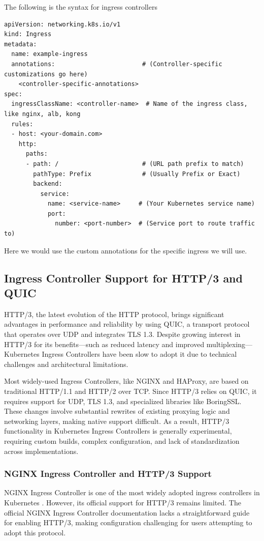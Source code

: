 The following is the syntax for ingress controllers
\begin{lstlisting}[breaklines=true,basicstyle=\small\ttfamily,frame=single]
apiVersion: networking.k8s.io/v1
kind: Ingress
metadata:
  name: example-ingress
  annotations:                        # (Controller-specific customizations go here)
    <controller-specific-annotations>
spec:
  ingressClassName: <controller-name>  # Name of the ingress class, like nginx, alb, kong
  rules:
  - host: <your-domain.com>
    http:
      paths:
      - path: /                       # (URL path prefix to match)
        pathType: Prefix              # (Usually Prefix or Exact)
        backend:
          service:
            name: <service-name>     # (Your Kubernetes service name)
            port:
              number: <port-number>  # (Service port to route traffic to)
\end{lstlisting}
Here we would use the custom annotations for the specific ingress we will use.


\subsection{Ingress Controller Support for HTTP/3 and QUIC}
HTTP/3, the latest evolution of the HTTP protocol, brings significant advantages in performance and reliability by using QUIC, a transport protocol that operates over UDP and integrates TLS 1.3. Despite growing interest in HTTP/3 for its benefits—such as reduced latency and improved multiplexing—Kubernetes Ingress Controllers have been slow to adopt it due to technical challenges and architectural limitations.

Most widely-used Ingress Controllers, like NGINX and HAProxy, are based on traditional HTTP/1.1 and HTTP/2 over TCP. Since HTTP/3 relies on QUIC, it requires support for UDP, TLS 1.3, and specialized libraries like BoringSSL. These changes involve substantial rewrites of existing proxying logic and networking layers, making native support difficult. As a result, HTTP/3 functionality in Kubernetes Ingress Controllers is generally experimental, requiring custom builds, complex configuration, and lack of standardization across implementations.


\subsubsection{NGINX Ingress Controller and HTTP/3 Support}

NGINX Ingress Controller is one of the most widely adopted ingress controllers in Kubernetes \cite{nginx-ingress-docs}. However, its official support for HTTP/3 remains limited. The official NGINX Ingress Controller documentation lacks a straightforward guide for enabling HTTP/3, making configuration challenging for users attempting to adopt this protocol.

